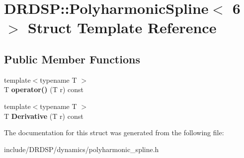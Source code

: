 \hypertarget{struct_d_r_d_s_p_1_1_polyharmonic_spline_3_016_01_4}{\section{D\-R\-D\-S\-P\-:\-:Polyharmonic\-Spline$<$ 6 $>$ Struct Template Reference}
\label{struct_d_r_d_s_p_1_1_polyharmonic_spline_3_016_01_4}
}
\subsection*{Public Member Functions}
\begin{DoxyCompactItemize}
\item 
\hypertarget{struct_d_r_d_s_p_1_1_polyharmonic_spline_3_016_01_4_ae1dd93153178876d0748a26fc2cb3b8e}{{\footnotesize template$<$typename T $>$ }\\T {\bfseries operator()} (T r) const }\label{struct_d_r_d_s_p_1_1_polyharmonic_spline_3_016_01_4_ae1dd93153178876d0748a26fc2cb3b8e}

\item 
\hypertarget{struct_d_r_d_s_p_1_1_polyharmonic_spline_3_016_01_4_ad994c2a115155d2e20a8e2b0af33dd9f}{{\footnotesize template$<$typename T $>$ }\\T {\bfseries Derivative} (T r) const }\label{struct_d_r_d_s_p_1_1_polyharmonic_spline_3_016_01_4_ad994c2a115155d2e20a8e2b0af33dd9f}

\end{DoxyCompactItemize}


The documentation for this struct was generated from the following file\-:\begin{DoxyCompactItemize}
\item 
include/\-D\-R\-D\-S\-P/dynamics/polyharmonic\-\_\-spline.\-h\end{DoxyCompactItemize}
